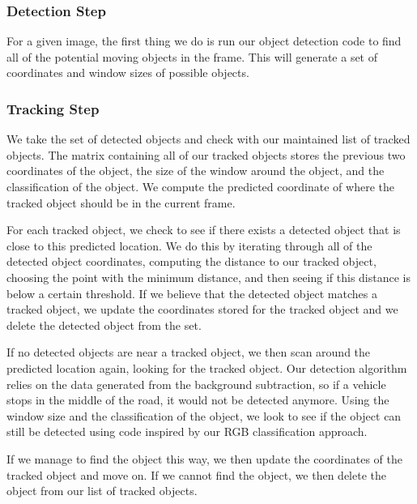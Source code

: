 \documentclass[a4paper, 10pt, conference]{ieeeconf}      %
\begin{document}
\subsubsection{Detection Step}

For a given image, the first thing we do is run our object detection code to find all of the potential moving objects in the frame. This will generate a set of coordinates and window sizes of possible objects. 
\newline


\subsubsection{Tracking Step}

We take the set of detected objects and check with our maintained list of tracked objects. The matrix containing all of our tracked objects stores the previous two coordinates of the object, the size of the window around the object, and the classification of the object. We compute the predicted coordinate of where the tracked object should be in the current frame. \newline

For each tracked object, we check to see if there exists a detected object that is close to this predicted location. We do this by iterating through all of the detected object coordinates, computing the distance to our tracked object, choosing the point with the minimum distance, and then seeing if this distance is below a certain threshold. If we believe that the detected object matches a tracked object, we update the coordinates stored for the tracked object and we delete the detected object from the set. \newline

If no detected objects are near a tracked object, we then scan around the predicted location again, looking for the tracked object. Our detection algorithm relies on the data generated from the background subtraction, so if a vehicle stops in the middle of the road, it would not be detected anymore. Using the window size and the classification of the object, we look to see if the object can still be detected using code inspired by our RGB classification approach. \newline

If we manage to find the object this way, we then update the coordinates of the tracked object and move on. If we cannot find the object, we then delete the object from our list of tracked objects. \newline 
\end{document}
